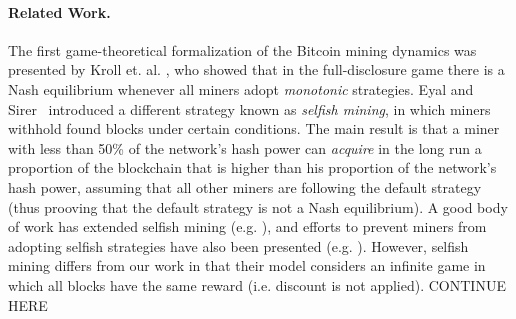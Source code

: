 \paragraph*{\bf Related Work.} The first game-theoretical formalization of the Bitcoin mining dynamics was presented by Kroll et. al. \cite{economics_of_mining2013}, who showed that in the full-disclosure game there is a Nash equilibrium whenever all miners adopt \emph{monotonic} strategies. Eyal and Sirer~\cite{selfishmining2014} introduced a different strategy known as \emph{selfish mining}, in which miners withhold found blocks under certain conditions. The main result is that a miner with less than 50\% of the network's hash power can \emph{acquire} in the long run a proportion of the blockchain that is higher than his proportion of the network's hash power, assuming that all other miners are following the default strategy (thus prooving that the default strategy is not a Nash equilibrium). A good body of work has extended selfish mining (e.g. \cite{optimalselfishmining2017,stubborn_mining:2016}), and efforts to prevent miners from adopting selfish strategies have also been presented (e.g. \cite{stop_selfish_mining2014,selfishmining2014}). However, selfish mining differs from our work in that their model considers an infinite game in which all blocks have the same reward (i.e. discount is not applied). CONTINUE HERE





